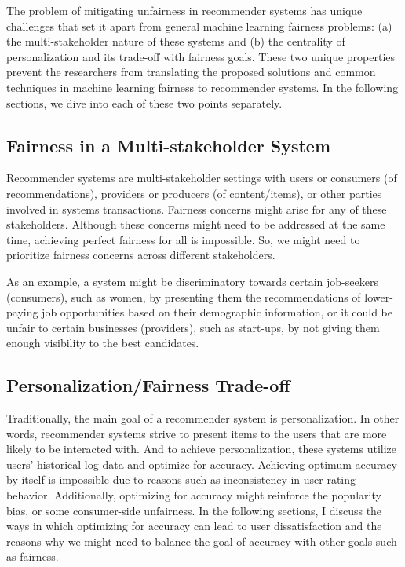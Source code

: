 The problem of mitigating unfairness in recommender systems has unique challenges that set it apart from general machine learning fairness problems: (a) the multi-stakeholder nature of these systems and (b) the centrality of personalization and its trade-off with fairness goals. These two unique properties prevent the researchers from translating the proposed solutions and common techniques in machine learning fairness to recommender systems. In the following sections, we dive into each of these two points separately.


\subsection{Fairness in a Multi-stakeholder System}

Recommender systems are multi-stakeholder settings with users or consumers (of recommendations), providers or producers (of content/items), or other parties involved in systems transactions. Fairness concerns might arise for any of these stakeholders. Although these concerns might need to be addressed at the same time, achieving perfect fairness for all is impossible. So, we might need to prioritize fairness concerns across different stakeholders.

As an example, a system might be discriminatory towards certain job-seekers (consumers), such as women, by presenting them the recommendations of lower-paying job opportunities based on their demographic information, or it could be unfair to certain businesses (providers), such as start-ups, by not giving them enough visibility to the best candidates.


\subsection{Personalization/Fairness Trade-off}

Traditionally, the main goal of a recommender system is personalization. In other words, recommender systems strive to present items to the users that are more likely to be interacted with. And to achieve personalization, these systems utilize users' historical log data and optimize for accuracy. Achieving optimum accuracy by itself is impossible due to reasons such as inconsistency in user rating behavior. Additionally, optimizing for accuracy might reinforce the popularity bias, or some consumer-side unfairness. In the following sections, I discuss the ways in which optimizing for accuracy can lead to user dissatisfaction and the reasons why we might need to balance the goal of accuracy with other goals such as fairness.

